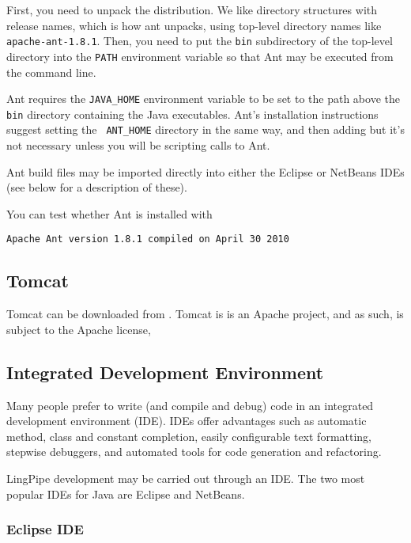 First, you need to unpack the distribution.  We like directory
structures with release names, which is how ant unpacks, using
top-level directory names like {\tt apache-ant-1.8.1}.  Then, you need
to put the {\tt bin} subdirectory of the top-level directory into the
{\tt PATH} environment variable so that Ant may be executed from the
command line.

Ant requires the {\tt JAVA\_HOME} environment variable to be set to
the path above the {\tt bin} directory containing the Java
executables.  Ant's installation instructions suggest setting the {\tt
ANT\_HOME} directory in the same way, and then adding but it's not
necessary unless you will be scripting calls to Ant.

Ant build files may be imported directly into either the Eclipse or
NetBeans IDEs (see below for a description of these).

You can test whether Ant is installed with
%
\begin{verbatim}
Apache Ant version 1.8.1 compiled on April 30 2010
\end{verbatim}


\subsection{Tomcat}\label{section:intro-tomcat}

Tomcat can be downloaded from
%
.
%
Tomcat is is an Apache project, and as such, is subject to the Apache license,
%
%

\subsection{Integrated Development Environment}

Many people prefer to write (and compile and debug) code in an
integrated development environment (IDE).  IDEs offer advantages such
as automatic method, class and constant completion, easily
configurable text formatting, stepwise debuggers, and automated tools
for code generation and refactoring.

LingPipe development may be carried out through an IDE.  The two most
popular IDEs for Java are Eclipse and NetBeans.

\subsubsection{Eclipse IDE}

